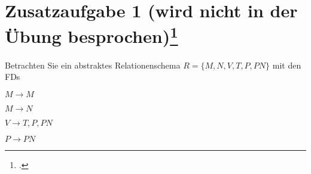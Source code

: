 \documentclass{lehramt-informatik}
\begin{document}
%

\section{Zusatzaufgabe 1 (wird nicht in der Übung
besprochen)\footcite{db:pdf:tum:uebung-08}}

Betrachten Sie ein abstraktes Relationenschema $R = \{M, N, V, T, P,
PN\}$ mit den FDs

\begin{compactitem}
\item $M \rightarrow M$
\item $M \rightarrow N$
\item $V \rightarrow T, P, PN$
\item $P \rightarrow PN$
\end{compactitem}
\end{document}
